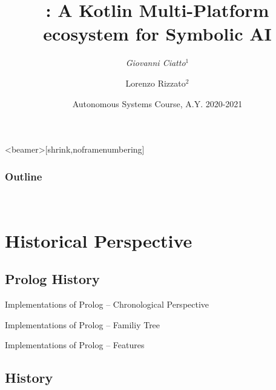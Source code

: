\documentclass[handout]{beamer}
\title[\twopkt]{
    \twopkt{}: A Kotlin Multi-Platform ecosystem for Symbolic AI
}
\author[Ciatto, Rizzato]{
    \emph{Giovanni Ciatto}$^{1}$ %
    \and
    Lorenzo Rizzato$^{2}$
}
\institute[UniBo]{
    $^{1}$ Dipartimento di Informatica -- Scienza e Ingegneria (DISI)
    \\
    \textsc{Alma Mater Studiorum} -- Università di Bologna
    \\
    \texttt{
        giovanni.ciatto@unibo.it %
    }
    \and
    $^{2}$\texttt{lorenzo.rizzato@studio.unibo.it}
}
\date[A.Y. 20-21]{
    Autonomous Systems Course, A.Y. 2020-2021
}
\begin{document}

\frame{\titlepage}

\begin{frame}<beamer>[shrink,noframenumbering]\frametitle{Outline}
    \mbox{~}
    \tableofcontents
    \mbox{~}
\end{frame}

\section{Historical Perspective}

\subsection{Prolog History}

\begin{frame}{Implementations of Prolog -- Chronological Perspective}
    
\end{frame}

\begin{frame}{Implementations of Prolog -- Familiy Tree}
    
\end{frame}

\begin{frame}[allowframebreaks]{Implementations of Prolog -- Features}
    
\end{frame}

\subsection{\tuprolog{} History}
\end{document}

